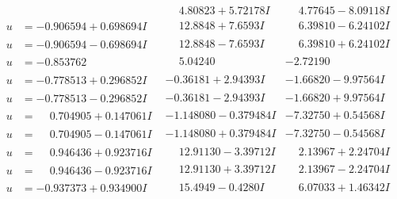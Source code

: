 \documentclass[1p]{elsarticle_modified}
\theoremstyle{definition}
\begin{document}
$$\begin{array}{c|c|c}
 & \phantom{-}4.80823 + 5.72178 I & \phantom{-}4.77645 - 8.09118 I \\ \hline\begin{aligned}
u &= -0.906594 + 0.698694 I\end{aligned}
 & \phantom{-}12.8848 + 7.6593 I & \phantom{-}6.39810 - 6.24102 I \\ \hline\begin{aligned}
u &= -0.906594 - 0.698694 I\end{aligned}
 & \phantom{-}12.8848 - 7.6593 I & \phantom{-}6.39810 + 6.24102 I \\ \hline\begin{aligned}
u &= -0.853762\phantom{ +0.000000I}\end{aligned}
 & \phantom{-}5.04240\phantom{ +0.000000I} & -2.72190\phantom{ +0.000000I} \\ \hline\begin{aligned}
u &= -0.778513 + 0.296852 I\end{aligned}
 & -0.36181 + 2.94393 I & -1.66820 - 9.97564 I \\ \hline\begin{aligned}
u &= -0.778513 - 0.296852 I\end{aligned}
 & -0.36181 - 2.94393 I & -1.66820 + 9.97564 I \\ \hline\begin{aligned}
u &= \phantom{-}0.704905 + 0.147061 I\end{aligned}
 & -1.148080 - 0.379484 I & -7.32750 + 0.54568 I \\ \hline\begin{aligned}
u &= \phantom{-}0.704905 - 0.147061 I\end{aligned}
 & -1.148080 + 0.379484 I & -7.32750 - 0.54568 I \\ \hline\begin{aligned}
u &= \phantom{-}0.946436 + 0.923716 I\end{aligned}
 & \phantom{-}12.91130 - 3.39712 I & \phantom{-}2.13967 + 2.24704 I \\ \hline\begin{aligned}
u &= \phantom{-}0.946436 - 0.923716 I\end{aligned}
 & \phantom{-}12.91130 + 3.39712 I & \phantom{-}2.13967 - 2.24704 I \\ \hline\begin{aligned}
u &= -0.937373 + 0.934900 I\end{aligned}
 & \phantom{-}15.4949 - 0.4280 I & \phantom{-}6.07033 + 1.46342 I \\ \hline\begin{aligned}

\end{aligned}
\end{array}$$
\end{document}
